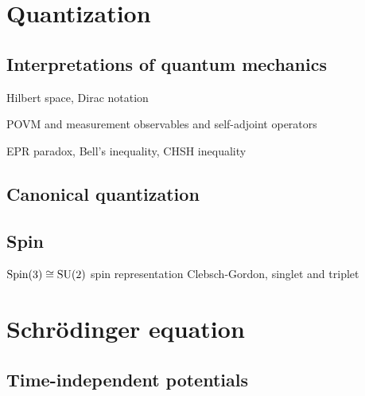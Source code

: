 \documentclass{../../large}
\begin{document}
\chapter{Quantization}

\section{Interpretations of quantum mechanics}
\begin{prb}
Hilbert space, Dirac notation
\end{prb}
\begin{prb}[Pictures]
\end{prb}
\begin{prb}
POVM and measurement
observables and self-adjoint operators
\end{prb}
\begin{prb}
EPR paradox, Bell's inequality, CHSH inequality
\end{prb}

\section{Canonical quantization}
\begin{prb}
\end{prb}
\begin{prb}
\end{prb}
\begin{prb}
\end{prb}

\section{Spin}
\begin{prb}
\end{prb}

$\mathrm{Spin}(3)\cong\mathrm{SU}(2)$
spin representation
Clebsch-Gordon, singlet and triplet





\chapter{Schr\"odinger equation}

\section{Time-independent potentials}
\end{document}
